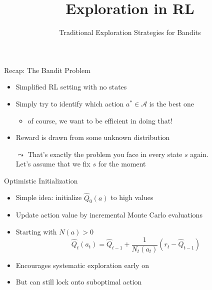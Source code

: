 \documentclass[aspectratio=169]{../latex_main/tntbeamer}  %
\title[RL: Exploration]{Exploration in RL}
\subtitle{Traditional Exploration Strategies for Bandits}
\begin{document}
	
	\maketitle

\begin{frame}[c]{Recap: The Bandit Problem}

\begin{itemize}
	\item Simplified RL setting with no states
	\item Simply try to identify which action $a^* \in \mathcal{A}$ is the best one
	\begin{itemize}
		\item of course, we want to be efficient in doing that!
	\end{itemize}
	\item Reward is drawn from some unknown distribution
	\bigskip
	\pause
	\item[$\leadsto$] That's exactly the problem you face in every state $s$ again.\\ Let's assume that we fix $s$ for the moment
\end{itemize}

\end{frame}
\begin{frame}[c]{Optimistic Initialization}
	
	\begin{itemize}
		\item Simple idea: initialize $\hat{Q}_0(a)$ to high values
		\item Update action value by incremental Monte Carlo evaluations
		\item Starting with $N(a) > 0$
		$$\hat{Q}_t(a_t) = \hat{Q}_{t-1} + \frac{1}{N_t(a_t)} (r_t - \hat{Q}_{t-1})$$
		\item Encourages systematic exploration early on
		\item But can still lock onto suboptimal action
	\end{itemize}
	
\end{frame}
\end{document}
